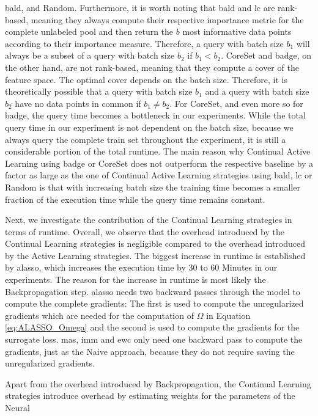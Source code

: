 \gls{bald}, and Random. Furthermore, it is worth noting that \gls{bald} and \gls{lc} are rank-based, meaning they always compute their respective
importance metric for the complete unlabeled pool and then return the $b$ most informative data points according to their importance measure. Therefore,
a query with batch size $b_1$ will always be a subset of a query with batch size $b_2$ if $b_1 < b_2$. CoreSet and \gls{badge}, on the other hand, are not
rank-based, meaning that they compute a cover of the feature space. The optimal cover depends on the batch size. Therefore, it is theoretically possible that
a query with batch size $b_1$ and a query with batch size $b_2$ have no data points in common if $b_1 \neq b_2$. For CoreSet, and even more so for \gls{badge},
the query time becomes a bottleneck in our experiments. While the total query time in our experiment is not dependent on the batch size, because we always query
the complete train set throughout the experiment, it is still a considerable portion of the total runtime. The main reason why
Continual Active Learning using \gls{badge} or CoreSet does not outperform the respective baseline by a factor as large as the one of Continual Active Learning
strategies using \gls{bald}, \gls{lc} or Random is that with increasing batch size the training time becomes a smaller fraction of the execution time while
the query time remains constant. \par
Next, we investigate the contribution of the Continual Learning strategies in terms of runtime. Overall, we observe that the overhead introduced by the
Continual Learning strategies is negligible compared to the overhead introduced by the Active Learning strategies. The biggest increase in runtime is established by
\gls{alasso}, which increases the execution time by 30 to 60 Minutes in our experiments. The reason for the increase in runtime is most likely the Backpropagation
step. \gls{alasso} needs two backward passes through the model to compute the complete gradients: The first is used to compute the unregularized gradients which
are needed for the computation of $\Omega$ in Equation \ref{eq:ALASSO_Omega} and the second is used to compute the gradients for the surrogate loss. \gls{mas}, \gls{imm}
and \gls{ewc} only need one backward pass to compute the gradients, just as the Naive approach, because they do not require saving the unregularized gradients. \par
Apart from the overhead introduced by Backpropagation, the Continual Learning strategies introduce overhead by estimating weights for the parameters of the Neural
